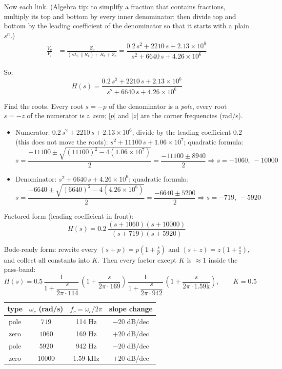 \documentclass[11pt]{article}
\newcommand{\solstep}[2]{\par\medskip{\color{stepc}\textbf{Step #1 --- #2}}\par\nopagebreak}
\begin{document}
Now each link. {\small (Algebra tip: to simplify a fraction that contains fractions, multiply its top and bottom by every inner denominator; then divide top and bottom by the leading coefficient of the denominator so that it starts with a plain $s^n$.)}
\begin{align*}
\frac{V_{o}}{V_{i}} &= \frac{Z_{o}}{\left(sL_{1} \parallel R_{1}\right) + R_{2} + Z_{o}} = \dfrac{0.2\,s^{2} + 2210\,s + 2.13\times 10^{6}}{s^{2} + 6640\,s + 4.26\times 10^{6}}
\end{align*}

So:\[
H(s) = \dfrac{0.2\,s^{2} + 2210\,s + 2.13\times 10^{6}}{s^{2} + 6640\,s + 4.26\times 10^{6}}
\]

\solstep{5}{Standard (Bode-ready) form}Find the roots. Every root $s=-p$ of the denominator is a \emph{pole}, every root $s=-z$ of the numerator is a \emph{zero}; $|p|$ and $|z|$ are the corner frequencies (rad/s).
\begin{itemize}[leftmargin=*,itemsep=2pt]
\item Numerator: $0.2\,s^{2} + 2210\,s + 2.13\times 10^{6}$; divide by the leading coefficient $0.2$ (this does not move the roots): $s^{2} + 11100\,s + 1.06\times 10^{7}$; quadratic formula:\[
s = \frac{-11100 \pm \sqrt{(11100)^2 - 4(1.06\times 10^{7})}}{2} = \frac{-11100 \pm 8940}{2} \Rightarrow s = -1060,\ -10000
\]

\item Denominator: $s^{2} + 6640\,s + 4.26\times 10^{6}$; quadratic formula:\[
s = \frac{-6640 \pm \sqrt{(6640)^2 - 4(4.26\times 10^{6})}}{2} = \frac{-6640 \pm 5200}{2} \Rightarrow s = -719,\ -5920
\]

\end{itemize}

Factored form (leading coefficient in front):
\[
H(s) = 0.2\,\dfrac{(s+1060)(s+10000)}{(s+719)(s+5920)}
\]

Bode-ready form: rewrite every $(s+p) = p\left(1+\frac{s}{p}\right)$ and $(s+z) = z\left(1+\frac{s}{z}\right)$, and collect all constants into $K$. Then every factor except $K$ is $\approx 1$ inside the pass-band:
\[
H(s) = 0.5\,\dfrac{1}{1+\dfrac{s}{2\pi\cdot 114}}\,\left(1+\dfrac{s}{2\pi\cdot 169}\right)\,\dfrac{1}{1+\dfrac{s}{2\pi\cdot 942}}\,\left(1+\dfrac{s}{2\pi\cdot 1.59\mathrm{k}}\right),\qquad K = 0.5
\]

\begin{center}\renewcommand{\arraystretch}{1.35}
\begin{tabular}{cccc}
\toprule
type & $\omega_c$ (rad/s) & $f_c=\omega_c/2\pi$ & slope change \\
\midrule
pole & $719$ & 114 Hz & $-20$ dB/dec \\
zero & $1060$ & 169 Hz & $+20$ dB/dec \\
pole & $5920$ & 942 Hz & $-20$ dB/dec \\
zero & $10000$ & 1.59 kHz & $+20$ dB/dec \\
\bottomrule
\end{tabular}\end{center}
\end{document}
